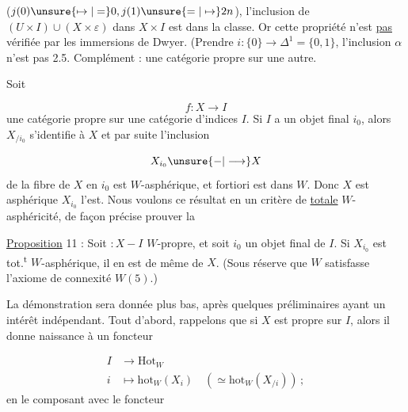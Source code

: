 ($j(0)\unsure{\mapsto|=}0,j(1)\unsure{=|\mapsto}2n$),  l'inclusion \inserted{$\alpha$} de $(U\times I)\cup(X\times\varepsilon)$ dans $X\times I$ est dans la classe. Or cette  propriété  n'est \uline{pas} vérifiée par les immersions de Dwyer. (Prendre $i:\{0\}\longrightarrow\Delta^1=\{0,1\}$, l'inclusion $\alpha$ n'est pas   
2.5. Complément :   une catégorie propre sur une autre.

Soit

\[
f:X\longrightarrow I
\]
une catégorie propre sur une catégorie d'indices $I$. Si $I$ a un objet final $i_0$, alors  $X_{/i_0}$ s'identifie à $X$ et par suite l'inclusion 

\[
X_{i_0}\unsure{-|\longrightarrow}X
\]
de la fibre de $X$ en $i_0$ est $W$-asphérique, et  fortiori est dans $W$. Donc $X$ est asphérique  $X_{i_0}$ l'est. Nous voulons  ce résultat en un critère de \uline{totale} $W$-asphéricité, de façon précise prouver la

\uline{Proposition} 11 : Soit $:X-I$ $W$-propre, et \margin{$\searrow\!\searrow$}soit $i_0$ un objet final de $I$. Si $X_{i_0}$ est tot.\textsuperscript{t} $W$-asphérique,  il en est de même de $X$. (Sous réserve que $W$ satisfasse l'axiome de connexité $W(5)$.)

La démonstration sera donnée plus bas, après quelques préliminaires ayant un intérêt indépendant. Tout d'abord, rappelons que si $X$ est propre sur $I$, alors il donne naissance à un foncteur

\[
\begin{aligned}
I&\longrightarrow\mathrm{Hot}_W\\
i&\longmapsto\mathrm{hot}_W(X_i)\quad(\simeq\mathrm{hot}_W(X_{/i}))\,;
\end{aligned}
\]
en le composant avec le foncteur

